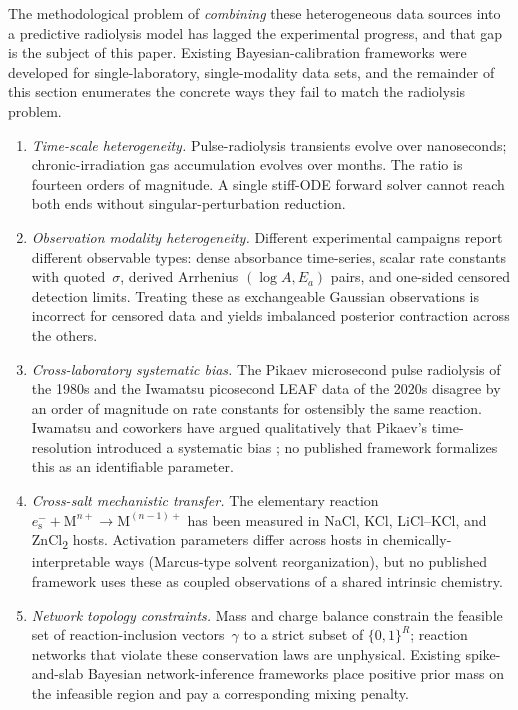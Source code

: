 \documentclass[12pt]{article}
\theoremstyle{plain}
\theoremstyle{definition}
\theoremstyle{remark}
\newcommand{\eS}{\ensuremath{e_{\mathrm{s}}^{-}}\xspace}
\newcommand{\Ea}{E_a}
\begin{document}
The methodological problem of \emph{combining} these heterogeneous data sources
into a predictive radiolysis model has lagged the experimental progress, and
that gap is the subject of this paper.  Existing Bayesian-calibration frameworks
were developed for single-laboratory, single-modality data sets, and the
remainder of this section enumerates the concrete ways they fail to match
the radiolysis problem.

\begin{enumerate}
\item \emph{Time-scale heterogeneity.}  Pulse-radiolysis transients evolve over
nanoseconds; chronic-irradiation gas accumulation evolves over months.  The
ratio is fourteen orders of magnitude.  A single stiff-ODE forward solver
cannot reach both ends without singular-perturbation reduction.
\item \emph{Observation modality heterogeneity.}  Different experimental
campaigns report different observable types: dense absorbance time-series,
scalar rate constants with quoted~$\sigma$, derived Arrhenius
$(\log A, \Ea)$ pairs, and one-sided censored detection limits.  Treating
these as exchangeable Gaussian observations is incorrect for censored data
and yields imbalanced posterior contraction across the others.
\item \emph{Cross-laboratory systematic bias.}  The Pikaev microsecond pulse
radiolysis of the 1980s and the Iwamatsu picosecond LEAF data of the 2020s
disagree by an order of magnitude on rate constants for ostensibly the same
reaction.  Iwamatsu and coworkers have argued qualitatively that Pikaev's
time-resolution introduced a systematic bias \citep{Iwamatsu2022}; no
published framework formalizes this as an identifiable parameter.
\item \emph{Cross-salt mechanistic transfer.}  The elementary reaction
$\eS+\mathrm{M}^{n+}\to\mathrm{M}^{(n-1)+}$ has been measured in NaCl, KCl,
LiCl--KCl, and ZnCl\textsubscript{2} hosts.  Activation parameters differ
across hosts in chemically-interpretable ways (Marcus-type solvent
reorganization), but no published framework uses these as coupled
observations of a shared intrinsic chemistry.
\item \emph{Network topology constraints.}  Mass and charge balance constrain
the feasible set of reaction-inclusion vectors~$\gamma$ to a strict subset of
$\{0,1\}^R$; reaction networks that violate these conservation laws are
unphysical.  Existing spike-and-slab Bayesian network-inference frameworks
\citep{GalagaliMarzouk2015,GalagaliMarzouk2019} place positive prior mass on
the infeasible region and pay a corresponding mixing penalty.
\end{enumerate}
\end{document}

